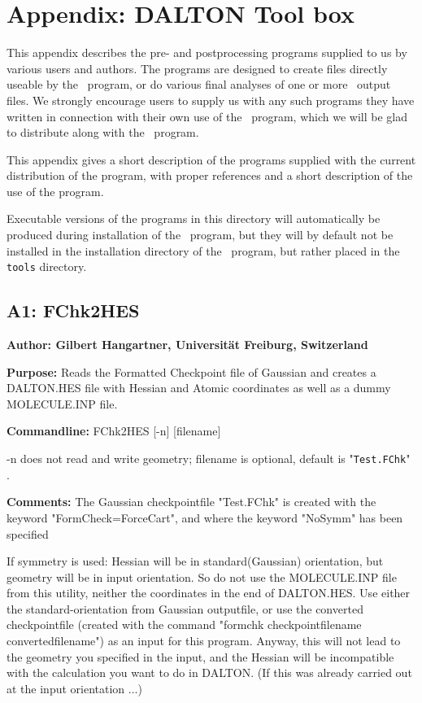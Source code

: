 \section*{Appendix: DALTON Tool box}

This appendix describes the pre- and postprocessing programs
supplied to us by various users and authors. The programs are designed
to create files directly useable by the \siraba\ program, or do
various final analyses of one or more \siraba\ output files. We
strongly encourage users to supply us with any such programs they have
written in connection with their own use of the \siraba\ program,
which we will be glad to distribute along with the \siraba\
program.

This appendix gives a short description of the programs supplied with
the current distribution of the program, with proper references and a
short description of the use of the program.

Executable versions of the programs in this directory will
automatically be produced during installation of the \siraba\ program,
but they will by default not be installed in the installation
directory of the \siraba\ program, but rather placed in the
\verb|tools| directory.

\subsection*{A1: FChk2HES}

\noindent
{\large\bf Author: \normalsize\large Gilbert Hangartner,
Universit\"{a}t Freiburg, Switzerland}

\smallskip

\noindent 
{\bf Purpose:} Reads the Formatted Checkpoint file of Gaussian  
     and creates a DALTON.HES file with Hessian and Atomic coordinates
     as well as a dummy MOLECULE.INP file.

\smallskip
\noindent
{\bf Commandline:} FChk2HES [-n] [filename]

-n does not read and write geometry; filename is optional, default is
"\verb|Test.FChk|" .

\smallskip
\noindent
{\bf Comments:}     The Gaussian checkpointfile "Test.FChk" is created
     with the keyword "FormCheck=ForceCart", and where the keyword "NoSymm"
     has  been specified

If symmetry is used: Hessian will be in standard(Gaussian) orientation,
        but geometry will be in input orientation. So do not use the
        MOLECULE.INP file from this utility, neither the coordinates in the
        end of DALTON.HES.
        Use either the standard-orientation from Gaussian outputfile, or
        use the converted checkpointfile (created with the command
        "formchk checkpointfilename convertedfilename") as an input for
        this program. Anyway, this will not lead to the geometry you 
        specified in the input, and the Hessian will be incompatible with the
        calculation you want to do in DALTON. (If this was already carried
        out at the input orientation ...)

